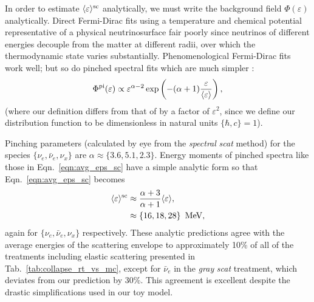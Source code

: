 \documentclass[aps,floatfix,prd,superscriptaddress,twocolumn]{revtex4-1}
\begin{document}
In order to estimate $\langle \varepsilon \rangle^{\rm sc}$ analytically,
we must write the background field $\Phi(\varepsilon)$ analytically.
Direct Fermi-Dirac fits using a temperature and chemical potential
representative of a physical neutrinosurface fair poorly since neutrinos of
different energies decouple from the matter at different radii, over which
the thermodynamic state varies substantially.
Phenomenological Fermi-Dirac fits work well;
but so do pinched spectral fits which are much simpler
\cite{keil2003-pinched_spectra,miri2016-sn_neutrinos}:
\begin{equation}
  \label{eqn:pinched_spectra}
  \Phi^{\rm pi}(\varepsilon) \propto
  \varepsilon^{\alpha-2}
  \exp\left(-(\alpha+1)\frac{\varepsilon}{\langle\varepsilon\rangle}\right),
\end{equation}
(where our definition differs from that of \cite{keil2003-pinched_spectra}
by a factor of
$\varepsilon^2$, since we define our distribution function to be dimensionless
in natural units $\{\hbar,c\}=1$).

Pinching parameters
(calculated by eye from the \emph{spectral} \emph{scat} method)
for the species
$\{\nu_e,\bar{\nu}_e,\nu_x\}$ are $\alpha\approx\{3.6,5.1,2.3\}$.
Energy moments of pinched spectra like those in Eqn.~\ref{eqn:avg_eps_sc}
have a simple analytic form so that Eqn.~\ref{eqn:avg_eps_sc} becomes
\begin{align}
  \label{eqn:pinched_avg_eps_sc_1}
  \langle\varepsilon\rangle^{\rm sc}
  &\approx \frac{\alpha+3}{\alpha+1} \langle\varepsilon\rangle, \\
  \label{eqn:pinched_avg_eps_sc_3}
  &\approx \{16,18,28\}\,~{\rm MeV},
\end{align}
again for $\{\nu_e,\bar{\nu}_e,\nu_x\}$ respectively.
These analytic predictions agree with the average energies of the scattering
envelope to approximately 10\%
of all of the treatments including elastic scattering presented
in Tab.~\ref{tab:collapse_rt_vs_mc}, except for
$\bar{\nu}_e$ in the \emph{gray} \emph{scat} treatment,
which deviates from our prediction by 30\%.
This agreement is excellent despite the drastic
simplifications used in our toy model.
\end{document}
